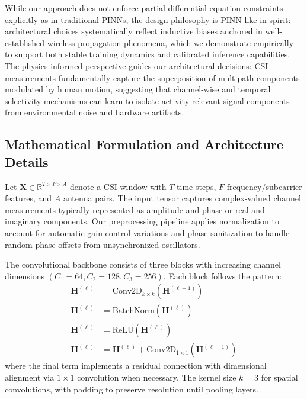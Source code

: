\documentclass[lettersize,journal]{IEEEtran}
\begin{document}
While our approach does not enforce partial differential equation constraints explicitly as in traditional PINNs, the design philosophy is PINN-like in spirit: architectural choices systematically reflect inductive biases anchored in well-established wireless propagation phenomena, which we demonstrate empirically to support both stable training dynamics and calibrated inference capabilities. The physics-informed perspective guides our architectural decisions: CSI measurements fundamentally capture the superposition of multipath components modulated by human motion, suggesting that channel-wise and temporal selectivity mechanisms can learn to isolate activity-relevant signal components from environmental noise and hardware artifacts.

\subsection{Mathematical Formulation and Architecture Details}

Let $\mathbf{X}\in \mathbb{R}^{T\times F\times A}$ denote a CSI window with $T$ time steps, $F$ frequency/subcarrier features, and $A$ antenna pairs. The input tensor captures complex-valued channel measurements typically represented as amplitude and phase or real and imaginary components. Our preprocessing pipeline applies normalization to account for automatic gain control variations and phase sanitization to handle random phase offsets from unsynchronized oscillators.

The convolutional backbone consists of three blocks with increasing channel dimensions $(C_1{=}64, C_2{=}128, C_3{=}256)$. Each block follows the pattern:
\begin{align}
\mathbf{H}^{(\ell)} &= \mathrm{Conv2D}_{k\times k}(\mathbf{H}^{(\ell-1)}) \\
\mathbf{H}^{(\ell)} &= \mathrm{BatchNorm}(\mathbf{H}^{(\ell)}) \\
\mathbf{H}^{(\ell)} &= \mathrm{ReLU}(\mathbf{H}^{(\ell)}) \\
\mathbf{H}^{(\ell)} &= \mathbf{H}^{(\ell)} + \mathrm{Conv2D}_{1\times 1}(\mathbf{H}^{(\ell-1)})
\end{align}
where the final term implements a residual connection with dimensional alignment via $1{\times}1$ convolution when necessary. The kernel size $k{=}3$ for spatial convolutions, with padding to preserve resolution until pooling layers.
\end{document}
